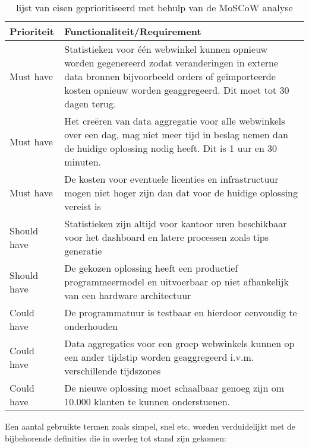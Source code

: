 \begin{table}[bh]
\centering
\caption{lijst van eisen geprioritiseerd met behulp van de MoSCoW analyse}
\label{table:requirements}
\def\arraystretch{1.5}
\begin{tabular}{|l|p{13cm}|}
\hline
\textbf{Prioriteit} & \textbf{Functionaliteit/Requirement}
\\ \hline
Must have           & Statistieken voor één webwinkel kunnen opnieuw worden gegenereerd zodat veranderingen in externe data bronnen bijvoorbeeld orders of geïmporteerde kosten opnieuw worden geaggregeerd. Dit moet tot 30 dagen terug.
\\ \hline
Must have           & Het creëren van data aggregatie voor alle webwinkels over een dag, mag niet meer tijd in beslag nemen dan de huidige oplossing nodig heeft. Dit is 1 uur en 30 minuten.
\\ \hline
Must have           & De kosten voor eventuele licenties en infrastructuur mogen niet hoger zijn dan dat voor de huidige oplossing vereist is
\\ \hline
Should have         & Statistieken zijn altijd voor kantoor uren beschikbaar voor het dashboard en latere processen zoals tips generatie
\\ \hline
Should have         & De gekozen oplossing heeft een productief programmeermodel en uitvoerbaar op niet afhankelijk van een hardware architectuur
\\ \hline
Could have         & De programmatuur is testbaar en hierdoor eenvoudig te onderhouden
\\ \hline
Could have          & Data aggregaties voor een groep webwinkels kunnen op een ander tijdstip worden geaggregeerd i.v.m. verschillende tijdszones
\\ \hline
Could have         & De nieuwe oplossing moet schaalbaar genoeg zijn om 10.000 klanten te kunnen onderstuenen.
\\ \hline
\end{tabular}
\end{table}

Een aantal gebruikte termen zoals simpel, snel etc. worden verduidelijkt met de bijbehorende definities die in overleg tot stand zijn gekomen: \\

